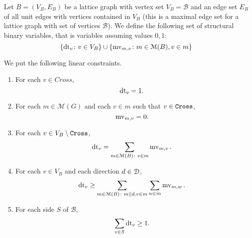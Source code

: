 \begin{definition}  
  Let $B = (V_B, E_B)$ be a lattice graph with vertex set $V_B = \mathcal{B}$ and an edge set $E_B$
    of all unit edges with vertices contained in $V_B$ (this is a maximal edge set for a lattice graph with set of vertices $\mathcal{B}$).
  We define the following set of structural binary variables, that is variables assuming values $0, 1$:
  \[
  \{ \operatorname{dt}_v \colon v \in V_B \} \cup \{ \operatorname{mv}_{m, v} \colon m \in \mathcal{M}(B), v \in m \}
  \]
  
  We put the following linear constraints.
  
  \begin{enumerate}
  \item  For each $v \in Cross$,
  \[
    \operatorname{dt}_v = 1.
  \]
  \item For each $m \in \mathcal{M}(G)$ and each $v \in m$ such that $v \in \texttt{Cross}$,
  \[
    \operatorname{mv}_{m, v} = 0.
  \]
  \item For each $v \in V_B \setminus \texttt{Cross}$, 
  \[ 
    \operatorname{dt}_v = \sum_{m \in \mathcal{M}(B) \colon v \in m} \operatorname{mv}_{m, v}.
  \]
  \item For each $v \in V_B$ and each direction $d \in \mathcal{D}$,
  \[
  	\operatorname{dt}_v \geq \sum_{m \in \mathcal{M}(B) \colon m || d, v \in m} \sum_{w \in m} \operatorname{mv}_{m, w}.
  \]
  \item For each side $S$ of $\mathcal{B}$,
  \[
  \sum_{v \in S} \operatorname{dt}_v \geq 1.
  \]
  \end{enumerate}
  \label{def:mip}
\end{definition}

